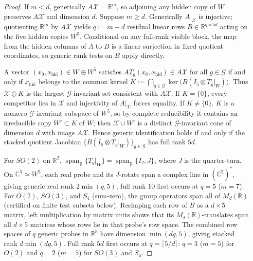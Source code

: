 \documentclass[11pt]{article}
\theoremstyle{plain}
\theoremstyle{definition}
\theoremstyle{remark}
\DeclareMathOperator{\spn}{span}
\begin{document}
\begin{proof}
If $m < d$, generically $A\mathcal{X} = \mathbb{R}^m$, so adjoining any hidden copy of $W$ preserves $A\mathcal{X}$ and dimension $d$.
Suppose $m \ge d$. Generically $A|_{\mathcal{X}}$ is injective; quotienting $\mathbb{R}^m$ by $A\mathcal{X}$ yields $q := m - d$ residual linear rows $B \in \mathbb{R}^{q \times 5d}$ acting on the five hidden copies $W^5$.
Conditional on any full-rank visible block, the map from the hidden columns of $A$ to $B$ is a linear surjection in fixed quotient coordinates, so generic rank tests on $B$ apply directly.

A vector $(x_0, x_{\mathrm{hid}}) \in W \oplus W^5$ satisfies $A T_g(x_0, x_{\mathrm{hid}}) \in A\mathcal{X}$ for all $g \in \mathcal{G}$ if and only if $x_{\mathrm{hid}}$ belongs to the common kernel $K := \bigcap_{g \in \mathcal{G}} \ker\bigl(B(I_5 \otimes T_g|_W)\bigr)$.
Thus $\mathcal{X} \oplus K$ is the largest $\mathcal{G}$-invariant set consistent with $A\mathcal{X}$.
If $K = \{0\}$, every competitor lies in $\mathcal{X}$ and injectivity of $A|_{\mathcal{X}}$ forces equality.
If $K \neq \{0\}$, $K$ is a nonzero $\mathcal{G}$-invariant subspace of $W^5$, so by complete reducibility it contains an irreducible copy $W' \subset K$ of $W$; then $\mathcal{X} \cup W'$ is a distinct $\mathcal{G}$-invariant cone of dimension $d$ with image $A\mathcal{X}$.
Hence generic identification holds if and only if the stacked quotient Jacobian $\{B(I_5 \otimes T_g|_W)\}_{g \in \mathcal{G}}$ has full rank $5d$.

For $SO(2)$ on $\mathbb{R}^2$, $\spn_{\mathbb{R}}\{T_g|_W\} = \spn_{\mathbb{R}}\{I_2, J\}$, where $J$ is the quarter-turn.
On $\mathbb{C}^5 \simeq W^5$, each real probe and its $J$-rotate span a complex line in $(\mathbb{C}^5)^*$, giving generic real rank $2\min(q, 5)$; full rank $10$ first occurs at $q = 5$ ($m = 7$).
For $O(2)$, $SO(3)$, and $S_4$ (sum-zero), the group operators span all of $M_d(\mathbb{R})$ (certified on finite test subsets below).
Reshaping each row of $B$ as a $d \times 5$ matrix, left multiplication by matrix units shows that its $M_d(\mathbb{R})$-translates span all $d \times 5$ matrices whose rows lie in that probe's row space.
The combined row spaces of $q$ generic probes in $\mathbb{R}^5$ have dimension $\min(dq, 5)$, giving stacked rank $d\min(dq, 5)$.
Full rank $5d$ first occurs at $q = \lceil 5/d \rceil$: $q = 3$ ($m = 5$) for $O(2)$ and $q = 2$ ($m = 5$) for $SO(3)$ and $S_4$.
\end{proof}
\end{document}
